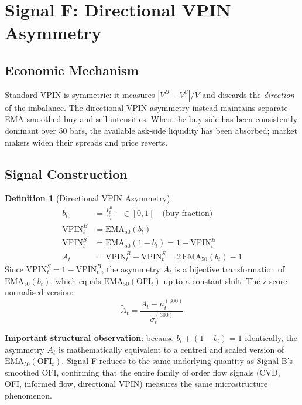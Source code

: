 \documentclass[12pt, a4paper]{article}
\theoremstyle{definition}
\newtheorem{definition}{Definition}[section]
\newcommand{\EMA}{\mathrm{EMA}}
\begin{document}
\section{Signal F: Directional VPIN Asymmetry}

\subsection{Economic Mechanism}

Standard VPIN is symmetric: it measures $|V^B - V^S|/V$ and discards
the \emph{direction} of the imbalance. The directional VPIN asymmetry
instead maintains separate EMA-smoothed buy and sell intensities. When
the buy side has been consistently dominant over 50 bars, the available
ask-side liquidity has been absorbed; market makers widen their spreads
and price reverts.

\subsection{Signal Construction}

\begin{definition}[Directional VPIN Asymmetry]
  \begin{align}
    b_t &= \frac{V_t^B}{V_t} \quad \in [0,1] \quad \text{(buy fraction)}\\
    \text{VPIN}^B_t &= \EMA_{50}(b_t)\\
    \text{VPIN}^S_t &= \EMA_{50}(1 - b_t) = 1 - \text{VPIN}^B_t\\
    A_t &= \text{VPIN}^B_t - \text{VPIN}^S_t = 2\,\EMA_{50}(b_t) - 1
  \end{align}
  Since $\text{VPIN}^S_t = 1 - \text{VPIN}^B_t$, the asymmetry $A_t$ is
  a bijective transformation of $\EMA_{50}(b_t)$, which equals
  $\EMA_{50}(\text{OFI}_t)$ up to a constant shift. The z-score normalised
  version:
  \[
    \tilde{A}_t = \frac{A_t - \mu_t^{(300)}}{\sigma_t^{(300)}}
  \]
\end{definition}

\textbf{Important structural observation}: because $b_t + (1-b_t) = 1$
identically, the asymmetry $A_t$ is mathematically equivalent to a centred
and scaled version of $\EMA_{50}(\text{OFI}_t)$. Signal F reduces to the
same underlying quantity as Signal B's smoothed OFI, confirming that the
entire family of order flow signals (CVD, OFI, informed flow, directional
VPIN) measures the same microstructure phenomenon.
\end{document}
